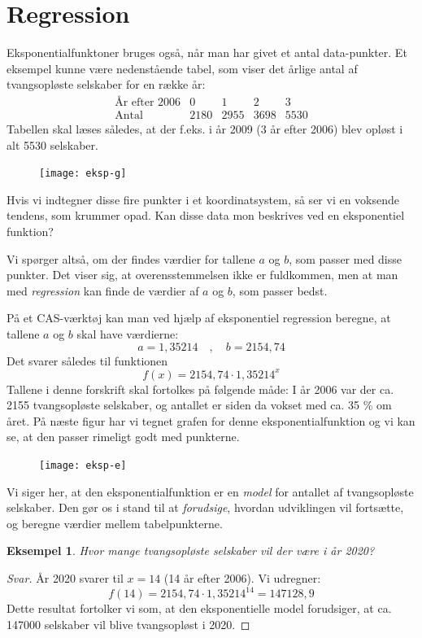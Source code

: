 \documentclass[12pt,oneside,a4paper]{article}
\theoremstyle{plain}
\newtheorem*{eks}{Eksempel}
\begin{document}
\section*{Regression}
Eksponentialfunktoner bruges også, når man har givet et antal
data-punkter. Et eksempel kunne være nedenstående tabel, som viser det årlige
antal af tvangsopløste selskaber for en række år:
$$
\begin{array}{l|c|c|c|c}
    \mbox{År efter 2006} & 0 & 1 & 2 & 3 \\
    \hline
    \mbox{Antal} & 2180 & 2955 & 3698 & 5530
\end{array}
$$
Tabellen skal læses således, at der f.eks. i år 2009 (3 år efter 2006) blev
opløst i alt 5530 selskaber.

\begin{figure}[ht]
    \centering
    \texttt{[image: eksp-g]}
\end{figure}

Hvis vi indtegner disse fire punkter i et koordinatsystem, så ser vi en
voksende tendens, som krummer opad. Kan disse data mon beskrives ved en
eksponentiel funktion?

Vi spørger altså, om der findes værdier for tallene $a$ og $b$, som passer med
disse punkter. Det viser sig, at overensstemmelsen ikke er fuldkommen, men at man
med {\em regression} kan finde de værdier af $a$ og $b$, som passer bedst.

På et CAS-værktøj kan man ved hjælp af eksponentiel regression beregne, at
tallene $a$ og $b$ skal have værdierne: 
$$
a = 1,35214\quad,\quad b = 2154,74
$$
Det svarer således til funktionen 
$$
f(x) = 2154,74 \cdot 1,35214 ^x
$$
Tallene i denne forskrift skal fortolkes på følgende måde: I år 2006 var der
ca. 2155 tvangsopløste selskaber, og antallet er siden da vokset med ca. 35 \%
om året.  På næste figur har vi tegnet grafen for denne eksponentialfunktion
og vi kan se, at den passer rimeligt godt med punkterne.

\begin{figure}[ht]
    \centering
    \texttt{[image: eksp-e]}
    \label{eksp-e}
\end{figure}

Vi siger her, at den eksponentialfunktion er en {\em model} for antallet af
tvangsopløste selskaber. Den gør os i stand til at {\em forudsige}, hvordan
udviklingen vil fortsætte, og beregne værdier mellem tabelpunkterne.

\begin{eks}
    Hvor mange tvangsopløste selskaber vil der være i år 2020?
\end{eks}
\begin{proof}[Svar]
    År 2020 svarer til $x=14$ (14 år efter 2006). Vi udregner:
    $$
    f(14) = 2154,74 \cdot 1,35214^{14} = 147128,9
    $$
    Dette resultat fortolker vi som, at den eksponentielle
    model forudsiger, at ca. 147000 selskaber vil blive tvangsopløst i 2020.
\end{proof}
    
\end{document}
